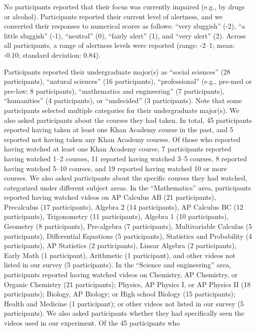 \documentclass[10pt]{article}
\begin{document}
No participants reported that their focus was currently impaired (e.g., by
drugs or alcohol). Participants reported their current level of alertness, and
we converted their responses to numerical scores as follows: ``very sluggish''
(-2), ``a little sluggish'' (-1), ``neutral'' (0), ``fairly alert'' (1), and
``very alert'' (2). Across all participants, a range of alertness levels were
reported (range: -2--1; mean: -0.10; standard deviation: 0.84).

Participants reported their undergraduate major(s) as ``social sciences'' (28
participants), ``natural sciences'' (16 participants), ``professional'' (e.g.,
pre-med or pre-law; 8 participants), ``mathematics and engineering'' (7
participants), ``humanities'' (4 participants), or ``undecided'' (3
participants). Note that some participants selected multiple categories for
their undergraduate major(s). We also asked participants about the courses they
had taken. In total, 45 participants reported having taken at least one Khan
Academy course in the past, and 5 reported not having taken any Khan Academy
courses. Of those who reported having watched at least one Khan Academy course,
7 participants reported having watched 1--2 courses, 11 reported having watched
3--5 courses, 8 reported having watched 5--10 courses, and 19 reported having
watched 10 or more courses. We also asked participants about the specific
courses they had watched, categorized under different subject areas. In the
``Mathematics'' area, participants reported having watched videos on AP
Calculus AB (21 participants), Precalculus (17 participants), Algebra 2 (14
participants), AP Calculus BC (12 participants), Trigonometry (11
participants), Algebra 1 (10 participants), Geometry (8 participants),
Pre-algebra (7 participants), Multivariable Calculus (5 participants),
Differential Equations (5 participants), Statistics and Probability (4
participants), AP Statistics (2 participants), Linear Algebra (2 participants),
Early Math (1 participant), Arithmetic (1 participant), and other videos not
listed in our survey (5 participants). In the ``Science and engineering'' area,
participants reported having watched videos on Chemistry, AP Chemistry, or
Organic Chemistry (21 participants); Physics, AP Physics I, or AP Physics II
(18 participants); Biology, AP Biology; or High school Biology (15
participants); Health and Medicine (1 participant); or other videos not listed
in our survey (5 participants). We also asked participants whether they had
specifically seen the videos used in our experiment. Of the 45 participants who
\end{document}
